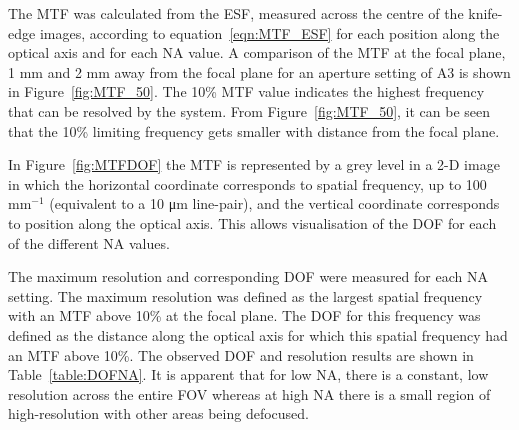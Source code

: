 The MTF was calculated from the ESF, measured across the centre of the knife-edge images, according to equation~\ref{eqn:MTF_ESF} for each position along the optical axis and for each NA value. A comparison of the MTF at the focal plane, 1 mm and 2 mm away from the focal plane for an aperture setting of A3 is shown in Figure~\ref{fig:MTF_50}.  %
The 10\% MTF value indicates the highest  frequency that can be resolved by the system. From Figure~\ref{fig:MTF_50}, it can be seen that the 10\% limiting frequency gets smaller with distance from the focal plane.

In Figure~\ref{fig:MTFDOF} the MTF is represented by a grey level in a 2-D image in which the horizontal coordinate corresponds to spatial frequency, up to 100 mm$^{-1}$ (equivalent to a 10 \si{\um} line-pair), and the vertical coordinate corresponds to position along the optical axis. This allows visualisation of the DOF for each of the different NA values.

The maximum resolution and corresponding DOF were measured for each NA setting. The maximum resolution was defined as the largest spatial frequency with an MTF above 10\% at the focal plane. The DOF for this frequency was defined as the distance along the optical axis for which this spatial frequency had an MTF above 10\%.  
The observed DOF and resolution results are shown in Table~\ref{table:DOFNA}.
It is apparent that for low NA, there is a constant, low resolution across the entire FOV whereas at high NA there is a small region of high-resolution with other areas being defocused. 



